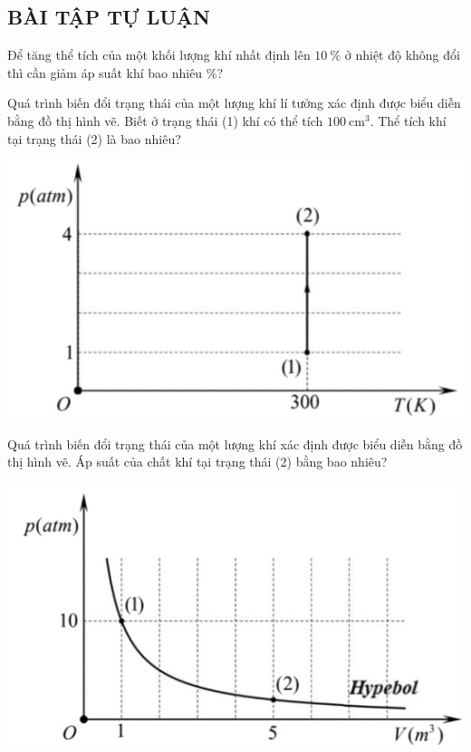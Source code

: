 \subsection{BÀI TẬP TỰ LUẬN}
\setcounter{ex}{0}
\begin{ex}
	Để tăng thể tích của một khối lượng khí nhất định lên $\SI{10}{\percent}$ ở nhiệt độ không đổi thì cần giảm áp suất khí bao nhiêu $\si{\percent}$?
\end{ex}
\begin{ex}
	Quá trình biến đổi trạng thái của một lượng khí lí tưởng xác định được biểu diễn bằng đồ thị hình vẽ. Biết ở trạng thái (1) khí có thể tích $\SI{100}{\centi\meter^3}$. Thể tích khí tại trạng thái (2) là bao nhiêu?
\begin{center}
	\includegraphics[scale=0.5]{figs/VN12-Y24-PH-SYL-010P-1}
\end{center}
\end{ex}
\begin{ex}
	Quá trình biến đổi trạng thái của một lượng khí xác định được biểu diễn bằng đồ thị hình vẽ. Áp suất của chất khí tại trạng thái (2) bằng bao nhiêu?
	\begin{center}
		\includegraphics[width=0.45\linewidth]{figs/VN12-Y24-PH-SYL-010P-2}
	\end{center}
	
\end{ex}
